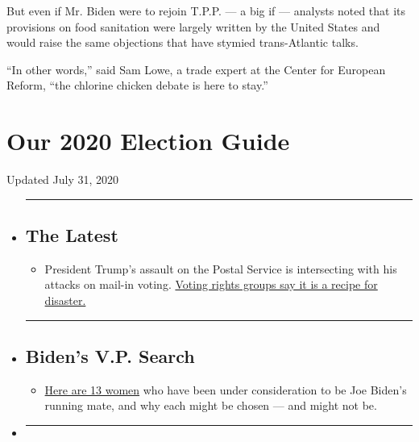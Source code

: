 But even if Mr. Biden were to rejoin T.P.P. --- a big if --- analysts
noted that its provisions on food sanitation were largely written by the
United States and would raise the same objections that have stymied
trans-Atlantic talks.

``In other words,'' said Sam Lowe, a trade expert at the Center for
European Reform, ``the chlorine chicken debate is here to stay.''

\hypertarget{our-2020-election-guide}{%
\section{Our 2020 Election Guide}\label{our-2020-election-guide}}

Updated July 31, 2020

\begin{itemize}
\item
  \begin{center}\rule{0.5\linewidth}{\linethickness}\end{center}

  \hypertarget{the-latest}{%
  \subsection{The Latest}\label{the-latest}}

  \begin{itemize}
  \tightlist
  \item
    President Trump's assault on the Postal Service is intersecting with
    his attacks on mail-in voting.
    \href{https://www.nytimes3xbfgragh.onion/2020/07/31/us/politics/trump-usps-mail-delays.html?action=click\&pgtype=Article\&state=default\&region=BELOW_MAIN_CONTENT\&context=storylines_guide}{Voting
    rights groups say it is a recipe for disaster.}
  \end{itemize}
\item
  \begin{center}\rule{0.5\linewidth}{\linethickness}\end{center}

  \hypertarget{bidens-vp-search}{%
  \subsection{Biden's V.P. Search}\label{bidens-vp-search}}

  \begin{itemize}
  \tightlist
  \item
    \href{https://www.nytimes3xbfgragh.onion/article/biden-vice-president-2020.html?action=click\&pgtype=Article\&state=default\&region=BELOW_MAIN_CONTENT\&context=storylines_guide}{Here
    are 13 women} who have been under consideration to be Joe Biden's
    running mate, and why each might be chosen --- and might not be.
  \end{itemize}
\item
  \begin{center}\rule{0.5\linewidth}{\linethickness}\end{center}


\end{itemize}
